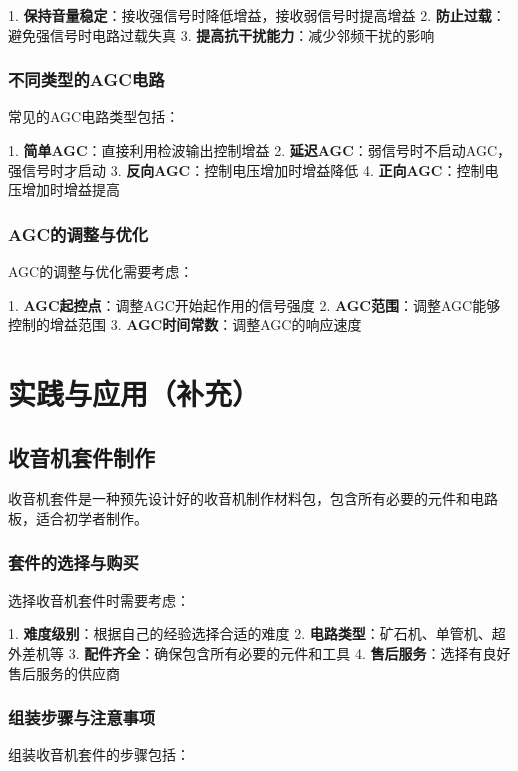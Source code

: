 \documentclass[12pt,UTF8]{ctexbook}
\begin{document}
1. \textbf{保持音量稳定}：接收强信号时降低增益，接收弱信号时提高增益
2. \textbf{防止过载}：避免强信号时电路过载失真
3. \textbf{提高抗干扰能力}：减少邻频干扰的影响

\section{不同类型的AGC电路}

常见的AGC电路类型包括：

1. \textbf{简单AGC}：直接利用检波输出控制增益
2. \textbf{延迟AGC}：弱信号时不启动AGC，强信号时才启动
3. \textbf{反向AGC}：控制电压增加时增益降低
4. \textbf{正向AGC}：控制电压增加时增益提高

\section{AGC的调整与优化}

AGC的调整与优化需要考虑：

1. \textbf{AGC起控点}：调整AGC开始起作用的信号强度
2. \textbf{AGC范围}：调整AGC能够控制的增益范围
3. \textbf{AGC时间常数}：调整AGC的响应速度

\part{实践与应用（补充）}

\chapter{收音机套件制作}

收音机套件是一种预先设计好的收音机制作材料包，包含所有必要的元件和电路板，适合初学者制作。

\section{套件的选择与购买}

选择收音机套件时需要考虑：

1. \textbf{难度级别}：根据自己的经验选择合适的难度
2. \textbf{电路类型}：矿石机、单管机、超外差机等
3. \textbf{配件齐全}：确保包含所有必要的元件和工具
4. \textbf{售后服务}：选择有良好售后服务的供应商

\section{组装步骤与注意事项}

组装收音机套件的步骤包括：
\end{document}
